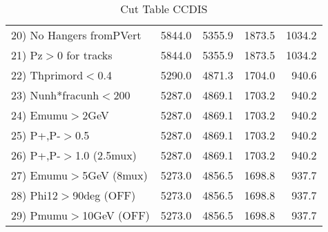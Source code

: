 \begin{table}[h!]
\begin{tabular}{||l||r|r|r|r||}
 20) No Hangers fromPVert &      5844.0 &      5355.9 &      1873.5 &      1034.2 \\
 21) Pz$>$0 for tracks    &      5844.0 &      5355.9 &      1873.5 &      1034.2 \\
 22) Thprimord$<$0.4      &      5290.0 &      4871.3 &      1704.0 &       940.6 \\
 23) Nunh*fracunh$<$200   &      5287.0 &      4869.1 &      1703.2 &       940.2 \\
 24) Emumu$>$2GeV         &      5287.0 &      4869.1 &      1703.2 &       940.2 \\
 25) P+,P-$>$0.5          &      5287.0 &      4869.1 &      1703.2 &       940.2 \\
 26) P+,P-$>$1.0 (2.5mux) &      5287.0 &      4869.1 &      1703.2 &       940.2 \\
 27) Emumu$>$5GeV  (8mux) &      5273.0 &      4856.5 &      1698.8 &       937.7 \\
 28) Phi12$>$90deg  (OFF) &      5273.0 &      4856.5 &      1698.8 &       937.7 \\
 29) Pmumu$>$10GeV  (OFF) &      5273.0 &      4856.5 &      1698.8 &       937.7 \\
 \hline
 \hline
 \end{tabular}
 \caption{Cut Table  CCDIS  }
 \label{tab-cut_ccdis}
 \end{table}
